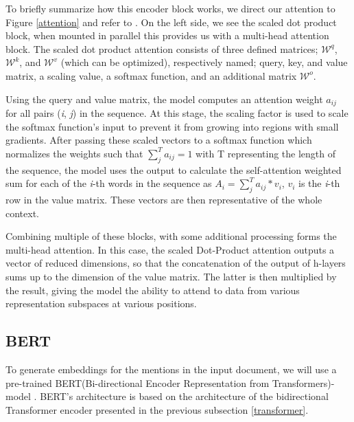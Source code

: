 To briefly summarize how this encoder block works, we direct our attention to Figure \ref{attention} and refer to \cite{Attention}. On the left side, we see the scaled dot product block, when mounted in parallel this provides us with a multi-head attention block. The scaled dot product attention consists of three defined matrices; $\mathcal{W}^q$, $\mathcal{W}^k$, and $\mathcal{W}^v$ (which can be optimized), respectively named; query, key, and value matrix, a scaling value, a softmax function, and an additional matrix $\mathcal{W}^o$.

Using the query and value matrix, the model computes an attention weight $a_{ij}$ for all pairs (\textit{i}, \textit{j}) in the sequence. At this stage, the scaling factor is used to scale the softmax function's input to prevent it from growing into regions with small gradients. After passing these scaled vectors to a softmax function which normalizes the weights such that $\sum_{j}^{T}a_{ij} = 1$ with T representing the length of the sequence, the model uses the output to calculate the self-attention weighted sum for each of the \textit{i}-th words in the sequence as $A_{i}= \sum_{j}^{T} a_{ij} * v_{i}$, $v_{i}$ is the \textit{i}-th row in the value matrix. These vectors are then representative of the whole context.\cite{Attention} \newline

Combining multiple of these blocks, with some additional processing forms the multi-head attention. In this case, the scaled Dot-Product attention outputs a vector of reduced dimensions, so that the concatenation of the output of h-layers sums up to the dimension of the value matrix. The latter is then multiplied by the result, giving the model the ability to attend to data from various representation subspaces at various positions.

\subsection{BERT}
To generate embeddings for the mentions in the input document, we will use a pre-trained BERT(Bi-directional Encoder Representation from Transformers)-model \cite{BERT}. BERT's architecture is based on the architecture of the bidirectional Transformer encoder presented in the previous subsection \ref{transformer}.


